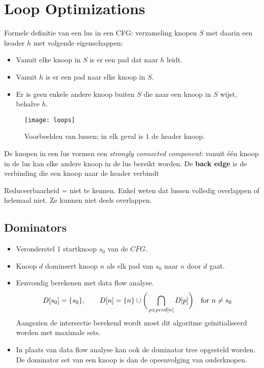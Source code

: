 \chapter{Loop Optimizations}

Formele definitie van een lus in een CFG: verzameling knopen $S$ met daarin een header $h$ met volgende eigenschappen:
\begin{itemize}
	\item Vanuit elke knoop in $S$ is er een pad dat naar $h$ leidt.
	\item Vanuit $h$ is er een pad naar elke knoop in $S$.
	\item Er is geen enkele andere knoop buiten $S$ die naar een knoop in $S$ wijst, behalve $h$.
\end{itemize}

\begin{figure}[ht]
	\centering
	\texttt{[image: loops]}
	\caption{Voorbeelden van lussen; in elk geval is $1$ de header knoop.}
	\label{fig:loops}
\end{figure}

De knopen in een lus vormen een \textit{strongly connected component}: vanuit één knoop in de lus kan elke andere knoop in de lus bereikt worden. De \textbf{back edge} is de verbinding die een knoop naar de header verbindt

Reduceerbaarheid = niet te kennen. Enkel weten dat lussen volledig overlappen of helemaal niet. Ze kunnen niet deels overlappen.

\section{Dominators}
\begin{itemize}
	\item Veronderstel 1 startknoop $s_0$ van de $CFG$.
	\item Knoop $d$ domineert knoop $n$ als elk pad van $s_0$ naar $n$ door $d$ gaat.
	\item Eenvoudig berekenen met data flow analyse. 
	$$D[s_0] = \{s_0\}, \qquad D[n] = \{n\} \cup \bigg(\bigcap_{p \in pred[n]} D[p] \bigg) \quad \hbox{for } n \neq s_0$$
	Aangezien de intersectie berekend wordt moet dit algoritme geïnitialiseerd worden met maximale sets.
	\item In plaats van data  flow analyse kan ook de dominator tree opgesteld worden. De dominator set van een knoop is dan de opeenvolging van ouderknopen.
\end{itemize}

